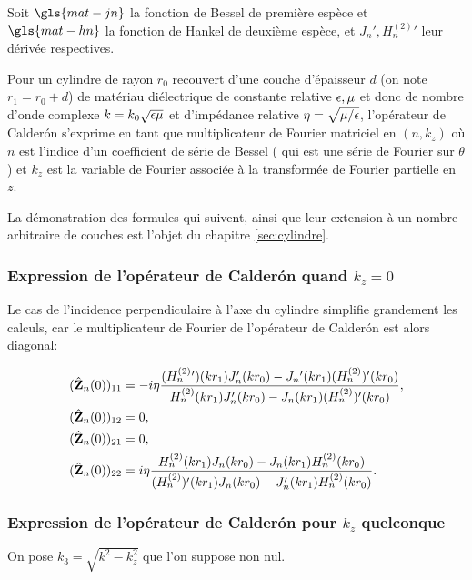     Soit \(\gls{mat-jn}\) la fonction de Bessel de première espèce et \(\gls{mat-hn}\) la fonction de Hankel de deuxième espèce, et \(J_n', H_n^{(2)}{}'\) leur dérivée respectives.

    Pour un cylindre de rayon \(r_0\) recouvert d'une couche d'épaisseur \(d\) (on note \(r_1=r_0 + d\)) de matériau diélectrique de constante relative \(\epsilon,\mu\) et donc de nombre d'onde complexe \(k = k_0\sqrt{\epsilon\mu}\) et d'impédance relative \(\eta=\sqrt{{\mu}/{\epsilon}}\), l'opérateur de Calderón s'exprime en tant que multiplicateur de Fourier matriciel en \((n,k_z)\) où \(n\) est l'indice d'un coefficient de série de Bessel ( qui est une série de Fourier sur \(\theta\) ) et \(k_z\) est la variable de Fourier associée à la transformée de Fourier partielle en \(z\).

    La démonstration des formules qui suivent, ainsi que leur extension à un nombre arbitraire de couches est l'objet du chapitre \ref{sec:cylindre}.

    \subsubsection{Expression de l'opérateur de Calderón quand \(k_z=0\)}
      Le cas de l'incidence perpendiculaire à l'axe du cylindre simplifie grandement les calculs, car le multiplicateur de Fourier de l'opérateur de Calderón est alors diagonal:

      \begin{align*}
        (\hat{\mathbf{Z}}_n(0))_{11} &= -i\eta\dfrac{
          (H^{(2)}_n{}')(kr_1)J_n'(kr_0)-J_n{}'(kr_1)(H^{(2)}_n{})'(kr_0)
        }{
          H^{(2)}_n(kr_1)J_n'(kr_0)-J_n(kr_1)(H^{(2)}_n{})'(kr_0)
        },
        \\
        (\hat{\mathbf{Z}}_n(0))_{12} &= 0,
        \\
        (\hat{\mathbf{Z}}_n(0))_{21} &= 0,
        \\
        (\hat{\mathbf{Z}}_n(0))_{22} &=i\eta\dfrac{
            H^{(2)}_n(kr_1)J_n(kr_0)-J_n(kr_1)H^{(2)}_n(kr_0)
          }{
            (H^{(2)}_n{})'(kr_1)J_n(kr_0)-J_n'(kr_1)H^{(2)}_n(kr_0)
          }.
      \end{align*}

    \subsubsection{Expression de l'opérateur de Calderón pour \(k_z\) quelconque}

      On pose \(k_3 = \sqrt{k^2 - k_z^2}\) que l'on suppose non nul.

